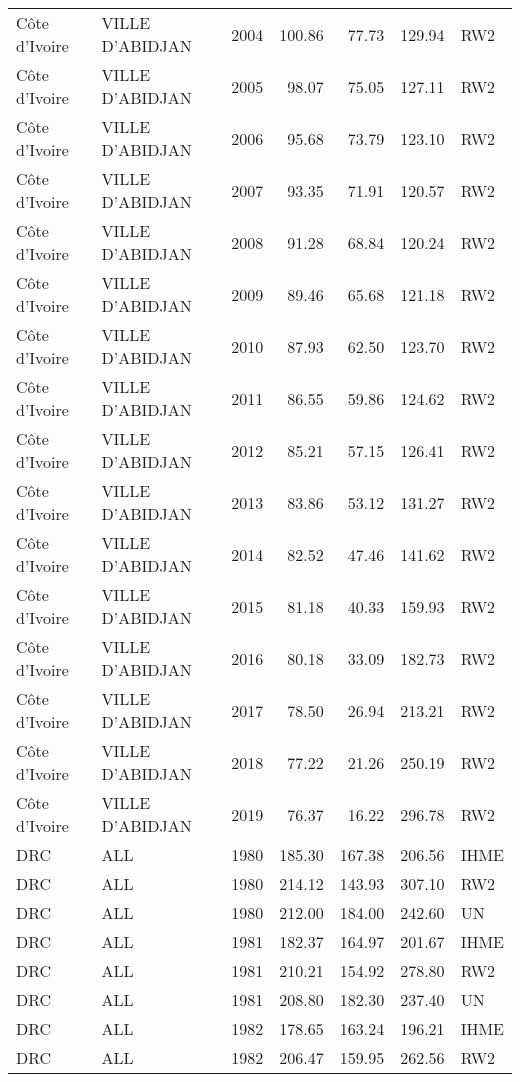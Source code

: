 \begin{longtable}{lllrrrl}
  C\^{o}te d'Ivoire & VILLE D'ABIDJAN & 2004 & 100.86 & 77.73 & 129.94 & RW2 \\ 
  C\^{o}te d'Ivoire & VILLE D'ABIDJAN & 2005 & 98.07 & 75.05 & 127.11 & RW2 \\ 
  C\^{o}te d'Ivoire & VILLE D'ABIDJAN & 2006 & 95.68 & 73.79 & 123.10 & RW2 \\ 
  C\^{o}te d'Ivoire & VILLE D'ABIDJAN & 2007 & 93.35 & 71.91 & 120.57 & RW2 \\ 
  C\^{o}te d'Ivoire & VILLE D'ABIDJAN & 2008 & 91.28 & 68.84 & 120.24 & RW2 \\ 
  C\^{o}te d'Ivoire & VILLE D'ABIDJAN & 2009 & 89.46 & 65.68 & 121.18 & RW2 \\ 
  C\^{o}te d'Ivoire & VILLE D'ABIDJAN & 2010 & 87.93 & 62.50 & 123.70 & RW2 \\ 
  C\^{o}te d'Ivoire & VILLE D'ABIDJAN & 2011 & 86.55 & 59.86 & 124.62 & RW2 \\ 
  C\^{o}te d'Ivoire & VILLE D'ABIDJAN & 2012 & 85.21 & 57.15 & 126.41 & RW2 \\ 
  C\^{o}te d'Ivoire & VILLE D'ABIDJAN & 2013 & 83.86 & 53.12 & 131.27 & RW2 \\ 
  C\^{o}te d'Ivoire & VILLE D'ABIDJAN & 2014 & 82.52 & 47.46 & 141.62 & RW2 \\ 
  C\^{o}te d'Ivoire & VILLE D'ABIDJAN & 2015 & 81.18 & 40.33 & 159.93 & RW2 \\ 
  C\^{o}te d'Ivoire & VILLE D'ABIDJAN & 2016 & 80.18 & 33.09 & 182.73 & RW2 \\ 
  C\^{o}te d'Ivoire & VILLE D'ABIDJAN & 2017 & 78.50 & 26.94 & 213.21 & RW2 \\ 
  C\^{o}te d'Ivoire & VILLE D'ABIDJAN & 2018 & 77.22 & 21.26 & 250.19 & RW2 \\ 
  C\^{o}te d'Ivoire & VILLE D'ABIDJAN & 2019 & 76.37 & 16.22 & 296.78 & RW2 \\ 
  DRC & ALL & 1980 & 185.30 & 167.38 & 206.56 & IHME \\ 
  DRC & ALL & 1980 & 214.12 & 143.93 & 307.10 & RW2 \\ 
  DRC & ALL & 1980 & 212.00 & 184.00 & 242.60 & UN \\ 
  DRC & ALL & 1981 & 182.37 & 164.97 & 201.67 & IHME \\ 
  DRC & ALL & 1981 & 210.21 & 154.92 & 278.80 & RW2 \\ 
  DRC & ALL & 1981 & 208.80 & 182.30 & 237.40 & UN \\ 
  DRC & ALL & 1982 & 178.65 & 163.24 & 196.21 & IHME \\ 
  DRC & ALL & 1982 & 206.47 & 159.95 & 262.56 & RW2 \\ 

\end{longtable}
